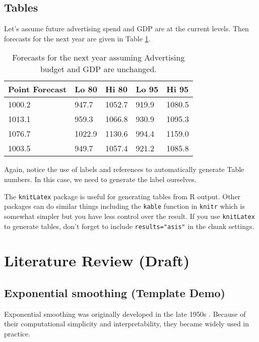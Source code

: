 \documentclass{aucklandthesis}
\begin{document}
\hypertarget{tables}{%
\section{Tables}\label{tables}}

Let's assume future advertising spend and GDP are at the current levels. Then forecasts for the next year are given in Table \ref{tab:salesforecasts}.

\begin{table}[ht]
\begin{center}
\begin{tabular}{lllll}
\toprule
Point Forecast & Lo 80 & Hi 80 & Lo 95 & Hi 95 \\
\midrule
1000.2 &  947.7 & 1052.7 & 919.9 & 1080.5 \\
1013.1 &  959.3 & 1066.8 & 930.9 & 1095.3 \\
1076.7 & 1022.9 & 1130.6 & 994.4 & 1159.0 \\
1003.5 &  949.7 & 1057.4 & 921.2 & 1085.8 \\
\bottomrule
\end{tabular}
\caption{Forecasts for the next year assuming Advertising budget and GDP are unchanged.}
\label{tab:salesforecasts}
\end{center}
\end{table}

Again, notice the use of labels and references to automatically generate Table numbers. In this case, we need to generate the label ourselves.

The \texttt{knitLatex} package is useful for generating tables from R output. Other packages can do similar things including the \texttt{kable} function in \texttt{knitr} which is somewhat simpler but you have less control over the result. If you use \texttt{knitLatex} to generate tables, don't forget to include \texttt{results="asis"} in the chunk settings.

\hypertarget{ch:litreview}{%
\chapter{Literature Review (Draft)}\label{ch:litreview}}

\hypertarget{sec:expsmooth}{%
\section{Exponential smoothing (Template Demo)}\label{sec:expsmooth}}

Exponential smoothing was originally developed in the late 1950s \autocite{Brown59,Brown63,Holt57,Winters60}. Because of their computational simplicity and interpretability, they became widely used in practice.
\end{document}
